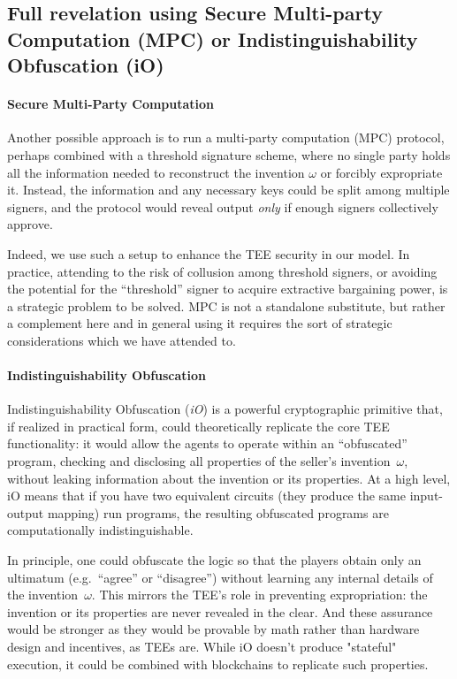 \documentclass{article}
\begin{document}
\subsection{Full revelation using Secure Multi-party Computation (MPC) or Indistinguishability Obfuscation (iO)}

\paragraph{Secure Multi-Party Computation}
Another possible approach is to run a multi-party computation (MPC) protocol, 
perhaps combined with a threshold signature scheme, where no single party holds all the information needed to reconstruct the invention $\omega$ or forcibly expropriate it. 
Instead, the information and any necessary keys could be split among multiple signers, 
and the protocol would reveal output \emph{only} if enough signers collectively approve.

Indeed, we use such a setup to enhance the TEE security in our model. In practice, attending to the risk of collusion among threshold signers, or avoiding the potential for the ``threshold'' signer to acquire extractive bargaining power, is a strategic problem to be solved. MPC is not a standalone substitute, but rather a complement here and in general using it requires the sort of strategic considerations which we have attended to.

\paragraph{Indistinguishability Obfuscation} Indistinguishability Obfuscation (\emph{iO}) is a powerful cryptographic primitive that, if realized in practical form, could theoretically replicate the core TEE functionality:
it would allow the agents to operate within an ``obfuscated'' program, checking and disclosing all properties of the seller's invention~$\omega$, without leaking information about the invention or its properties. At a high level, iO means that if you have two equivalent circuits (they produce the same input-output mapping) run programs, the resulting obfuscated programs are computationally indistinguishable. 

In principle, one could obfuscate the logic so that the players obtain only an ultimatum (e.g.\ ``agree'' or ``disagree'') without learning any internal details of the invention~$\omega$. This mirrors the TEE's role in preventing expropriation: the invention or its properties are never revealed in the clear. And these assurance would be stronger as they would be provable by math rather than hardware design and incentives, as TEEs are. While iO doesn't produce "stateful" execution, it could be combined with blockchains to replicate such properties.
\end{document}
